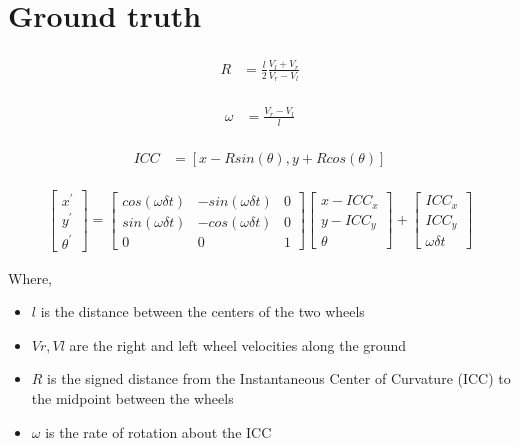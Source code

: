 \documentclass[paper=a4, fontsize=11pt]{scrartcl} %
\begin{document}
\section{Ground truth}

\begin{align} 
\begin{split}
R 	&= \frac{l}{2} \frac{V_l + V_r}{V_r - V_l}
\end{split}					
\end{align}

\begin{align} 
\begin{split}
\omega 	&= \frac{V_r - V_l}{l}
\end{split}					
\end{align}

\begin{align} 
\begin{split}
ICC 	&= [x - R sin(\theta), y + R cos(\theta)]
\end{split}					
\end{align}


\begin{align}
\begin{bmatrix}
x^{'} \\
y^{'} \\
\theta^{'}
\end{bmatrix}
= 
\begin{bmatrix}
cos(\omega \delta t) & -sin(\omega \delta t) & 0\\
sin(\omega \delta t) & -cos(\omega \delta t) & 0\\
0 & 0 & 1
\end{bmatrix}
\begin{bmatrix}
x - ICC_x\\
y - ICC_y \\
\theta
\end{bmatrix}
+
\begin{bmatrix}
ICC_x\\
ICC_y \\
\omega \delta t
\end{bmatrix}
\end{align}

Where,
\begin{itemize}
	\item $l$ is the distance between the centers of the two wheels
	\item $Vr, Vl$ are the right and left wheel velocities along the ground
	\item $R$ is the signed distance from the Instantaneous Center of Curvature (ICC) to the midpoint between the wheels
	\item $\omega$ is the rate of rotation about the ICC
\end{itemize}
\end{document}
